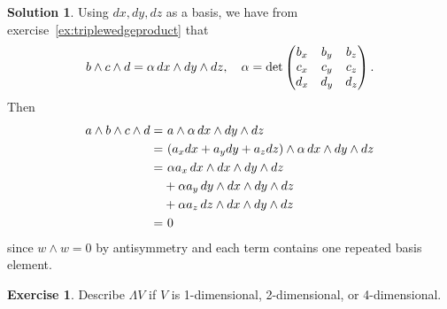 \documentclass[11pt, a4paper]{report}
\theoremstyle{definition}
\newtheorem{exercise}{Exercise}[part]
\newtheorem{solution}{Solution}[part]
\newenvironment{ex}{\begin{exercise}}{\end{exercise}\pagebreak[1]}
\newenvironment{sol}{\begin{solution}}{\end{solution}\pagebreak[3]}
\renewcommand*{\d}{\ensuremath\mathop{}\mathopen{}d}
\begin{document}
\begin{sol}

Using $dx, dy, dz$ as a basis, we have from exercise~\ref{ex:triplewedgeproduct} that
\[
    b \wedge c \wedge d = \alpha \d x \wedge dy \wedge dz, \quad
    \alpha = \det \begin{pmatrix}
        b_x & b_y & b_z \\
        c_x & c_y & c_z \\
        d_x & d_y & d_z
    \end{pmatrix}.
\]
Then
\begin{align*}
    a \wedge b \wedge c \wedge d =&\ a \wedge \alpha \d x \wedge dy \wedge dz \\
        =&\ (a_x dx + a_y dy + a_z dz) \wedge \alpha \d x \wedge dy \wedge dz \\
        =&\ \alpha a_x \d x \wedge dx \wedge dy \wedge dz \\
        &+ \alpha a_y \d y \wedge dx \wedge dy \wedge dz \\
        &+ \alpha a_z \d z \wedge dx \wedge dy \wedge dz \\
        =&\ 0
\end{align*}
since $w \wedge w = 0$ by antisymmetry and each term contains one repeated basis element.

\end{sol}

\begin{ex}

Describe $\Lambda V$ if $V$ is 1-dimensional, 2-dimensional, or 4-dimensional.

\end{ex}
\end{document}
